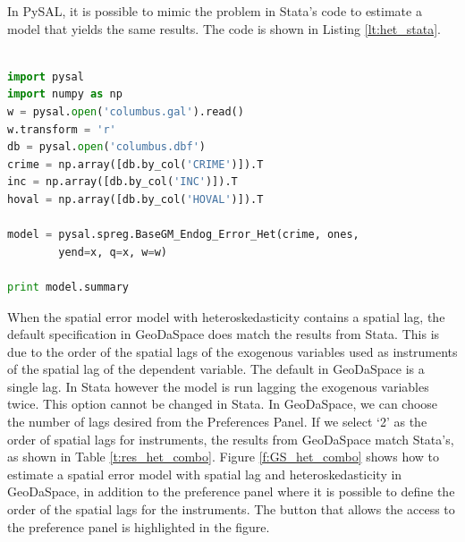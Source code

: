 \documentclass{article}
\begin{document}
In PySAL, it is possible to mimic the problem in Stata's code to estimate a model that yields the same results. The code is shown in Listing \ref{lt:het_stata}.

\begin{code}
\begin{lstlisting}[label=lt:het_stata,caption=Using PySAL to match the results of spatial error models with heteroskedasticity from Stata,language=Python]

import pysal
import numpy as np
w = pysal.open('columbus.gal').read()
w.transform = 'r'
db = pysal.open('columbus.dbf')
crime = np.array([db.by_col('CRIME')]).T
inc = np.array([db.by_col('INC')]).T
hoval = np.array([db.by_col('HOVAL')]).T

model = pysal.spreg.BaseGM_Endog_Error_Het(crime, ones,
        yend=x, q=x, w=w)

print model.summary

\end{lstlisting}
\end{code}

When the spatial error model with heteroskedasticity contains a spatial lag, the default specification in GeoDaSpace does match the results from Stata. This is due to the order of the spatial lags of the exogenous variables used as instruments of the spatial lag of the dependent variable. The default in GeoDaSpace is a single lag. In Stata however the model is run lagging the exogenous variables twice. This option cannot be changed in Stata. In GeoDaSpace, we can choose the number of lags desired from the Preferences Panel. If we select `2' as the order of spatial lags for instruments, the results from GeoDaSpace match Stata's, as shown in Table \ref{t:res_het_combo}. Figure \ref{f:GS_het_combo} shows how to estimate a spatial error model with spatial lag and heteroskedasticity in GeoDaSpace, in addition to the preference panel where it is possible to define the order of the spatial lags for the instruments. The button that allows the access to the preference panel is highlighted in the figure.
\end{document}
